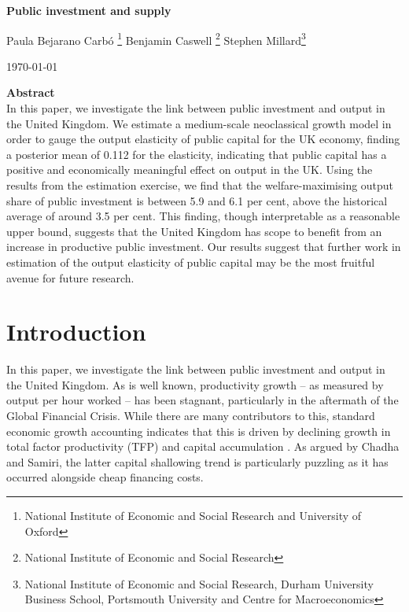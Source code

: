 \documentclass[titlepage, 11pt, a4paper]{article}
\renewcommand{\&}{and}
\begin{document}
\thispagestyle{empty}
\begin{center}
    \vspace*{2cm}

    {\Large \bfseries Public investment and supply \par}
    \vspace{1.5cm}

    {\large
    Paula Bejarano Carbó \footnote{National Institute of Economic and Social Research and University of Oxford} \quad
   Benjamin Caswell \footnote{National Institute of Economic and Social Research} \quad Stephen Millard\footnote{National Institute of Economic and Social Research, Durham University Business School, Portsmouth University and Centre for Macroeconomics} \par }

   
    {\large \today \par}
    \vfill
   

    \begin{minipage}{0.9\textwidth}
    \textbf{Abstract} \\
    \noindent
    In this paper, we investigate the link between public investment and output in the United Kingdom. We estimate a medium-scale neoclassical growth model in order to gauge the output elasticity of public capital for the UK economy, finding a posterior mean of 0.112 for the elasticity, indicating that public capital has a positive and economically meaningful effect on output in the UK.  
    Using the results from the estimation exercise, we find that the welfare-maximising output share of public investment is between 5.9  and 6.1 per cent, above the historical average of around 3.5 per cent. 
    This finding, though interpretable as a reasonable upper bound, suggests that the United Kingdom has scope to benefit from an increase in productive public investment.
    Our results suggest that further work in estimation of the output elasticity of public capital may be the most fruitful avenue for future research.
    \end{minipage}

    \vfill
\end{center}
\newpage

\tableofcontents 
\thispagestyle{empty}

\pagebreak 

\setcounter{page}{1} 
\section{Introduction}
In this paper, we investigate the link between public investment and output in the United Kingdom. As is well known, productivity growth – as measured by output per hour worked – has been stagnant, particularly in the aftermath of the Global Financial Crisis. 
While there are many contributors to this, standard economic growth accounting indicates that this is driven by declining growth in total factor productivity (TFP) and capital accumulation \citep{chadha2025understanding}. 
As argued by Chadha and Samiri, the latter capital shallowing trend is particularly puzzling as it has occurred alongside cheap financing costs. 
\end{document}
